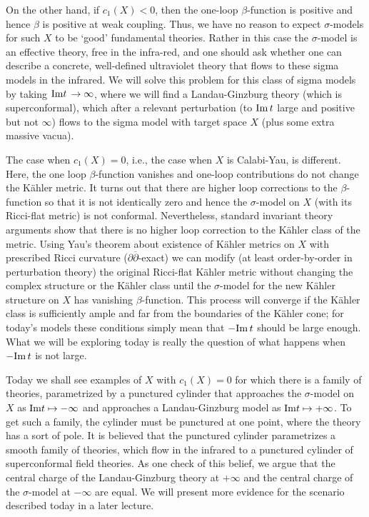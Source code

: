On the other hand, if $c_1(X)<0$, then the one-loop $\beta$-function is
positive and hence $\beta$ is positive at weak coupling.
Thus, we have
no reason to expect
$\sigma$-models for such $X$ to be `good' fundamental theories. Rather
in this case the $\sigma$-model is an
effective theory, free in the infra-red, and one should
ask whether one can describe a concrete, well-defined ultraviolet
theory that flows to these sigma models in the infrared.
We will solve this problem for this class of sigma models
by taking ${\rm Im}t\,\to\infty$, where we will find
a Landau-Ginzburg  theory (which is superconformal), which after a relevant
perturbation (to ${\rm Im}\,t$ large and positive but not $\infty$)
flows to the sigma model with target space $X$ (plus some extra massive vacua).


The case when $c_1(X)=0$, i.e., the case when $X$ is  Calabi-Yau, is
different. Here, the one loop $\beta$-function vanishes and
one-loop contributions do not change the K\"ahler metric. It turns out
that there are higher loop corrections to the $\beta$-function so that
it is not identically zero and hence the $\sigma$-model on $X$ (with
its Ricci-flat metric) is not conformal.
Nevertheless, standard invariant theory arguments show that there is
no higher loop correction to the K\"ahler class of the metric. Using Yau's
theorem about existence of K\"ahler metrics on $X$ with prescribed
Ricci curvature ($\partial\overline\partial$-exact) we can modify (at
least order-by-order in perturbation theory) the original Ricci-flat
K\"ahler metric without changing the complex structure or the K\"ahler
class until the $\sigma$-model for the new K\"ahler structure on $X$
has vanishing $\beta$-function.  This process will converge if the
K\"ahler class is sufficiently ample and far from the boundaries of the
K\"ahler cone; for today's models these conditions simply mean that
$-{\rm Im}\,t$ should be large enough.  What we will be exploring
today is really the question of what happens when $-{\rm Im}\,t$ is not large.

Today we shall see examples of $X$ with $c_1(X)=0$ for which there is
a family  of theories, parametrized by a punctured cylinder that approaches
the $\sigma$-model on $X$ as ${\rm Im}t\mapsto -\infty$ and approaches  a
Landau-Ginzburg model as ${\rm Im}t\mapsto +\infty$.  To get such a
family, the cylinder must be punctured at one point, where the theory
has a sort of pole.   It is believed
that the punctured cylinder parametrizes a smooth family of theories,
which flow in the infrared to  a punctured cylinder of
superconformal field theories. As one check of this belief, we argue that
the central charge of the Landau-Ginzburg theory at $+\infty$ and the
central charge of the $\sigma$-model at $-\infty$ are equal.
We will present more evidence for the scenario described today
 in a later lecture.


